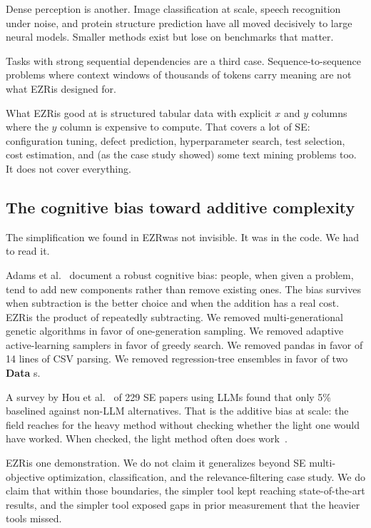 \documentclass[AMA,STIX2COL]{WileyNJDv5}
\newcommand{\IT}{{\sffamily EZR}}
\newcommand{\cls}[1]{%
  \setlength{\fboxsep}{1.5pt}%
  \colorbox{clsbg}{\sffamily\bfseries{#1}}%
}
\begin{document}
{Dense perception is another. Image classification at scale,
speech recognition under noise, and protein structure
prediction have all moved decisively to large neural models.
Smaller methods exist but lose on benchmarks that matter.

Tasks with strong sequential dependencies are a third case.
Sequence-to-sequence problems where context windows of
thousands of tokens carry meaning are not what \IT is designed
for.

What \IT is good at is structured tabular data with explicit
$x$ and $y$ columns where the $y$ column is expensive to
compute. That covers a lot of SE: configuration tuning, defect
prediction, hyperparameter search, test selection, cost
estimation, and (as the case study showed) some text mining
problems too. It does not cover everything.

\subsection{The cognitive bias toward additive complexity}

The simplification we found in \IT was not invisible. It was
in the code. We had to read it.

Adams et al.~\cite{adams2021people} document a robust cognitive
bias: people, when given a problem, tend to add new components
rather than remove existing ones. The bias survives when
subtraction is the better choice and when the addition has a
real cost. \IT is the product of repeatedly subtracting. We
removed multi-generational genetic algorithms in favor of
one-generation sampling. We removed adaptive active-learning
samplers in favor of greedy search. We removed pandas in favor
of 14 lines of CSV parsing. We removed regression-tree
ensembles in favor of two \cls{Data}s.

A survey by Hou et al.~\cite{Hou24} of 229 SE papers using
LLMs found that only 5\% baselined against non-LLM
alternatives. That is the additive bias at scale: the field
reaches for the heavy method without checking whether the
light one would have worked. When checked, the light method
often does
work~\cite{grinsztajn2022why,somvanshi2024survey,Tawosi23,
majumder2018500+,Ling24,Fu17,johnson2024ai}.

\IT is one demonstration. We do not claim it generalizes
beyond SE multi-objective optimization, classification, and
the relevance-filtering case study. We do claim that within
those boundaries, the simpler tool kept reaching
state-of-the-art results, and the simpler tool exposed gaps
in prior measurement that the heavier tools missed.

}
\end{document}
